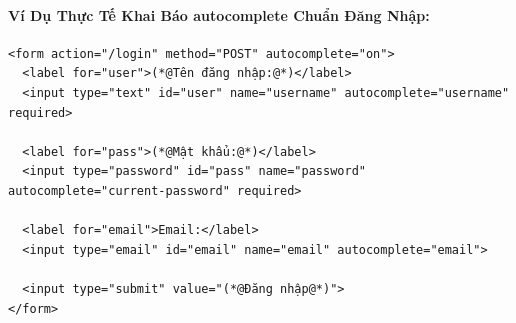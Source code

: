 \paragraph{Ví Dụ Thực Tế Khai Báo autocomplete Chuẩn Đăng Nhập:}

\begin{codeWindow}
\begin{lstlisting}[language=HTML5]
<form action="/login" method="POST" autocomplete="on">
  <label for="user">(*@Tên đăng nhập:@*)</label>
  <input type="text" id="user" name="username" autocomplete="username" required>

  <label for="pass">(*@Mật khẩu:@*)</label>
  <input type="password" id="pass" name="password" autocomplete="current-password" required>

  <label for="email">Email:</label>
  <input type="email" id="email" name="email" autocomplete="email">

  <input type="submit" value="(*@Đăng nhập@*)">
</form>
\end{lstlisting}
\end{codeWindow}

